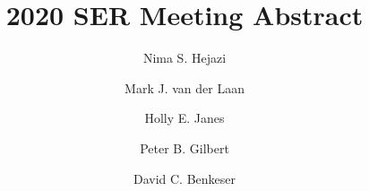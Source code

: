 \documentclass[]{elsarticle} %
\begin{document}
\begin{frontmatter}

  \title{2020 SER Meeting Abstract}
    \author[biostat-berkeley]{Nima S. Hejazi}
  
    \author[epibiostat-berkeley]{Mark J. van der Laan}
  
    \author[fredhutch]{Holly E. Janes}
  
    \author[fredhutch]{Peter B. Gilbert}
  
    \author[emory]{David C. Benkeser}
  
      \address[biostat-berkeley]{Graduate Group in Biostatistics, University of California, Berkeley}
    \address[epibiostat-berkeley]{Division of Epidemiology and Biostatistics, University of California,
Berkeley}
    \address[fredhutch]{Vaccine and Infectious Disease Division, Fred Hutchinson Cancer Research
Center}
    \address[emory]{Department of Biostatistics and Bioinformatics, Emory University}
  
  \begin{abstract}
  
  \end{abstract}
  
 \end{frontmatter}
\end{document}

